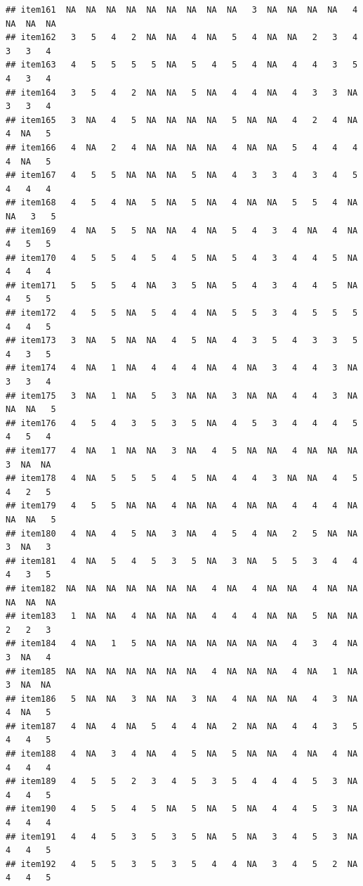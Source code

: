 \documentclass[
  man]{apa6}
\begin{document}
\begin{verbatim}
## item161  NA  NA  NA  NA  NA  NA  NA  NA  NA   3  NA  NA  NA  NA   4  NA  NA  NA
## item162   3   5   4   2  NA  NA   4  NA   5   4  NA  NA   2   3   4   3   3   4
## item163   4   5   5   5   5  NA   5   4   5   4  NA   4   4   3   5   4   3   4
## item164   3   5   4   2  NA  NA   5  NA   4   4  NA   4   3   3  NA   3   3   4
## item165   3  NA   4   5  NA  NA  NA  NA   5  NA  NA   4   2   4  NA   4  NA   5
## item166   4  NA   2   4  NA  NA  NA  NA   4  NA  NA   5   4   4   4   4  NA   5
## item167   4   5   5  NA  NA  NA   5  NA   4   3   3   4   3   4   5   4   4   4
## item168   4   5   4  NA   5  NA   5  NA   4  NA  NA   5   5   4  NA  NA   3   5
## item169   4  NA   5   5  NA  NA   4  NA   5   4   3   4  NA   4  NA   4   5   5
## item170   4   5   5   4   5   4   5  NA   5   4   3   4   4   5  NA   4   4   4
## item171   5   5   5   4  NA   3   5  NA   5   4   3   4   4   5  NA   4   5   5
## item172   4   5   5  NA   5   4   4  NA   5   5   3   4   5   5   5   4   4   5
## item173   3  NA   5  NA  NA   4   5  NA   4   3   5   4   3   3   5   4   3   5
## item174   4  NA   1  NA   4   4   4  NA   4  NA   3   4   4   3  NA   3   3   4
## item175   3  NA   1  NA   5   3  NA  NA   3  NA  NA   4   4   3  NA  NA  NA   5
## item176   4   5   4   3   5   3   5  NA   4   5   3   4   4   4   5   4   5   4
## item177   4  NA   1  NA  NA   3  NA   4   5  NA  NA   4  NA  NA  NA   3  NA  NA
## item178   4  NA   5   5   5   4   5  NA   4   4   3  NA  NA   4   5   4   2   5
## item179   4   5   5  NA  NA   4  NA  NA   4  NA  NA   4   4   4  NA  NA  NA   5
## item180   4  NA   4   5  NA   3  NA   4   5   4  NA   2   5  NA  NA   3  NA   3
## item181   4  NA   5   4   5   3   5  NA   3  NA   5   5   3   4   4   4   3   5
## item182  NA  NA  NA  NA  NA  NA  NA   4  NA   4  NA  NA   4  NA  NA  NA  NA  NA
## item183   1  NA  NA   4  NA  NA  NA   4   4   4  NA  NA   5  NA  NA   2   2   3
## item184   4  NA   1   5  NA  NA  NA  NA  NA  NA  NA   4   3   4  NA   3  NA   4
## item185  NA  NA  NA  NA  NA  NA  NA   4  NA  NA  NA   4  NA   1  NA   3  NA  NA
## item186   5  NA  NA   3  NA  NA   3  NA   4  NA  NA  NA   4   3  NA   4  NA   5
## item187   4  NA   4  NA   5   4   4  NA   2  NA  NA   4   4   3   5   4   4   5
## item188   4  NA   3   4  NA   4   5  NA   5  NA  NA   4  NA   4  NA   4   4   4
## item189   4   5   5   2   3   4   5   3   5   4   4   4   5   3  NA   4   4   5
## item190   4   5   5   4   5  NA   5  NA   5  NA   4   4   5   3  NA   4   4   4
## item191   4   4   5   3   5   3   5  NA   5  NA   3   4   5   3  NA   4   4   5
## item192   4   5   5   3   5   3   5   4   4  NA   3   4   5   2  NA   4   4   5

\end{verbatim}
\end{document}
